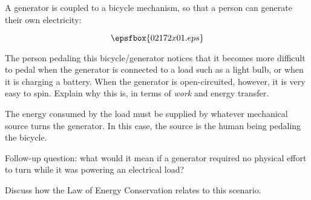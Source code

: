 

A generator is coupled to a bicycle mechanism, so that a person can generate their own electricity:

$$\epsfbox{02172x01.eps}$$

The person pedaling this bicycle/generator notices that it becomes more difficult to pedal when the generator is connected to a load such as a light bulb, or when it is charging a battery.  When the generator is open-circuited, however, it is very easy to spin.  Explain why this is, in terms of {\it work} and energy transfer.







The energy consumed by the load must be supplied by whatever mechanical source turns the generator.  In this case, the source is the human being pedaling the bicycle.

\vskip 10pt

Follow-up question: what would it mean if a generator required no physical effort to turn while it was powering an electrical load?







Discuss how the Law of Energy Conservation relates to this scenario.




